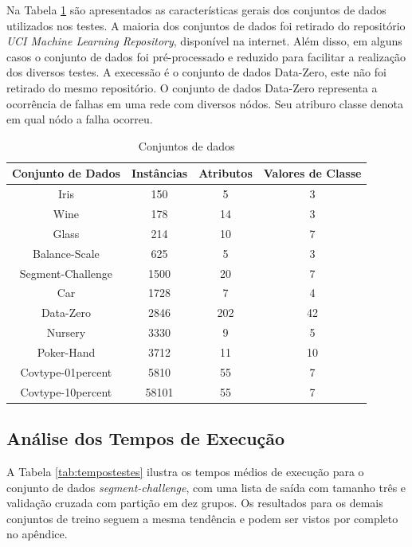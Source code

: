 Na Tabela \ref{tab:datasets} são apresentados as características gerais dos conjuntos de dados utilizados nos testes.
A maioria dos conjuntos de dados foi retirado do repositório \textit{UCI Machine Learning Repository}, disponível na internet.
Além disso, em alguns casos o conjunto de dados foi pré-processado e reduzido para facilitar a realização dos diversos testes.
A execessão é o conjunto de dados Data-Zero, este não foi retirado do mesmo repositório.
O conjunto de dados Data-Zero representa a ocorrência de falhas em uma rede com diversos nódos.
Seu atriburo classe denota em qual nódo a falha ocorreu.

\begin{table}[h!]
  \begin{center}
    \begin{tabular}{cccc}
      \hline
      \textbf{Conjunto de Dados} & \textbf{Instâncias} & \textbf{Atributos} & \textbf{Valores de Classe} \\
      \hline

      Iris & 150 & 5 & 3 \\
      Wine & 178 & 14 & 3 \\ 
      Glass & 214 & 10 & 7 \\
      Balance-Scale & 625 & 5 & 3 \\
      Segment-Challenge & 1500 & 20 & 7 \\
      Car & 1728 & 7 & 4 \\
      Data-Zero & 2846 & 202 & 42 \\
      Nursery & 3330 & 9 & 5 \\
      Poker-Hand & 3712 & 11 & 10 \\      
      Covtype-01percent & 5810 & 55 & 7 \\
      Covtype-10percent & 58101 & 55 & 7 \\    

      \hline
    \end{tabular}
    \caption{Conjuntos de dados}
    \label{tab:datasets}
  \end{center}
\end{table}

\subsection{Análise dos Tempos de Execução}

A Tabela \ref{tab:tempostestes} ilustra os tempos médios de execução para o conjunto de dados \textit{segment-challenge}, com uma lista de saída com tamanho três e validação cruzada com partição em dez grupos.
Os resultados para os demais conjuntos de treino seguem a mesma tendência e podem ser vistos por completo no apêndice.

